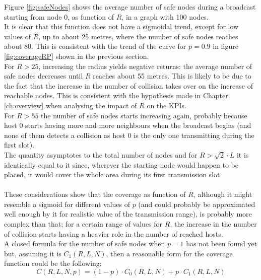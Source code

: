 \hfill \break
Figure \ref{fig:safeNodes} shows the average number of safe nodes during a
broadcast starting from node 0, as function of $R$, in a graph with 100 nodes.\\
It is clear that this function does not have a sigmoidal trend, except for low
values of $R$, up to about 25 metres, where the number of safe nodes reaches
about $80$. This is consistent with the trend of the curve for $p=0.9$ in
figure \ref{fig:coverageRP} shown in the previous section.\\
For $R > 25$, increasing the radius yields negative returns: the average number
of safe nodes decreases until $R$ reaches about 55 metres. This is likely to be
due to the fact that the increase in the number of collision takes over on the
increase of reachable nodes. This is consistent with the hypothesis made in
Chapter \ref{ch:overview} when analysing the impact of $R$ on the KPIs.\\
For $R > 55$ the number of safe nodes starts increasing again, probably because
host $0$ starts having more and more neighbours when the broadcast begins (and
none of them detects a collision as host 0 is the only one transmitting during
the first slot).\\ The quantity asymptotes to the total number of nodes and for
$R > \sqrt{2}{\cdot}L$ it is identically equal to it since, wherever the
starting node would happen to be placed, it would cover the whole area during
its first transmission slot.\\
\\
These considerations show that the coverage as function of $R$, although it
might resemble a sigmoid for different values of $p$ (and could probably be
approximated well enough by it for realistic value of the transmission range),
is probably more complex than that; for a certain range of values for $R$, the
increase in the number of collision starts having a heavier role in the number
of reached hosts.\\
A closed formula for the number of safe nodes when $p=1$ has not been found yet
but, assuming it is $C_{1}(R, L, N)$, then a reasonable form for the coverage
function could be the following:
\begin{equation}\label{eq:coverageClosedForm}
C(R, L, N, p) = (1-p)\cdot C_{0}(R, L, N) + p\cdot C_{1}(R, L, N)
\end{equation}
\pagebreak
